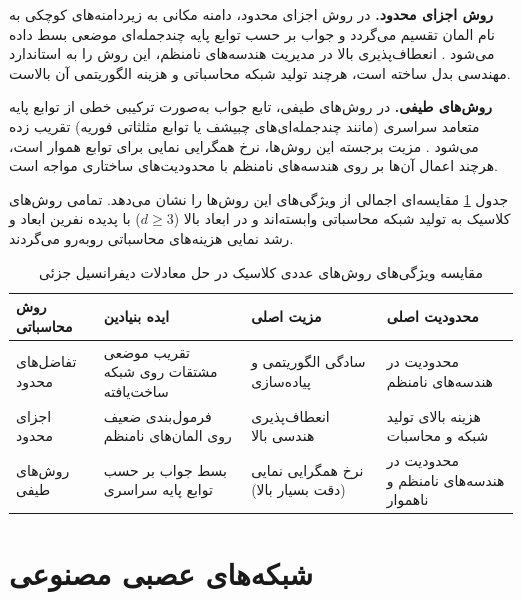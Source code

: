 \textbf{روش اجزای محدود.} در روش اجزای محدود، دامنه مکانی به زیردامنه‌های کوچکی به نام المان تقسیم می‌گردد و جواب بر حسب توابع پایه چندجمله‌ای موضعی بسط داده می‌شود \cite{zienkiewicz2005}. انعطاف‌پذیری بالا در مدیریت هندسه‌های نامنظم، این روش را به استاندارد مهندسی بدل ساخته است، هرچند تولید شبکه محاسباتی و هزینه الگوریتمی آن بالاست.

\textbf{روش‌های طیفی.} در روش‌های طیفی، تابع جواب به‌صورت ترکیبی خطی از توابع پایه متعامد سراسری (مانند چندجمله‌ای‌های چبیشف یا توابع مثلثاتی فوریه) تقریب زده می‌شود \cite{trefethen2000}. مزیت برجسته این روش‌ها، نرخ همگرایی نمایی برای توابع هموار است، هرچند اعمال آن‌ها بر روی هندسه‌های نامنظم با محدودیت‌های ساختاری مواجه است.

جدول \ref{tab:numerical} مقایسه‌ای اجمالی از ویژگی‌های این روش‌ها را نشان می‌دهد. تمامی روش‌های کلاسیک به تولید شبکه محاسباتی وابسته‌اند و در ابعاد بالا ($d \ge 3$) با پدیده نفرین ابعاد و رشد نمایی هزینه‌های محاسباتی روبه‌رو می‌گردند.

\begin{table}[t]
\caption{مقایسه ویژگی‌های روش‌های عددی کلاسیک در حل معادلات دیفرانسیل جزئی}
\label{tab:numerical}
\centering
\singlespacing
\renewcommand{\arraystretch}{1.25}
\begin{tabular}{|p{2.3cm}|p{3.5cm}|p{3.2cm}|p{3.9cm}|}
\hline
\textbf{روش محاسباتی} & \textbf{ایده بنیادین} & \textbf{مزیت اصلی} & \textbf{محدودیت اصلی} \\
\hline
تفاضل‌های محدود & تقریب موضعی مشتقات روی شبکه ساخت‌یافته & سادگی الگوریتمی و پیاده‌سازی & محدودیت در هندسه‌های نامنظم \\
\hline
اجزای محدود & فرمول‌بندی ضعیف روی المان‌های نامنظم & انعطاف‌پذیری هندسی بالا & هزینه بالای تولید شبکه و محاسبات \\
\hline
روش‌های طیفی & بسط جواب بر حسب توابع پایه سراسری & نرخ همگرایی نمایی (دقت بسیار بالا) & محدودیت در هندسه‌های نامنظم و ناهموار \\
\hline
\end{tabular}
\end{table}

\section{شبکه‌های عصبی مصنوعی}
\label{sec:ann}

